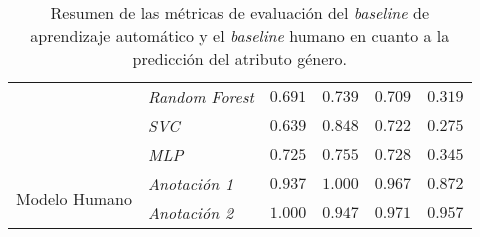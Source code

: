 \begin{table}[htpb]
{\begin{tabular}{llcccc}
        \cmidrule{2-6}
                                            & \emph{Random Forest}        & $0.691$ & $0.739$ & $0.709$ & $0.319$\\
        \cmidrule{2-6}
                                            & \emph{SVC}                  & $0.639$ & $0.848$ & $0.722$ & $0.275$\\
        \cmidrule{2-6}
                                            & \emph{MLP}                  & $0.725$ & $0.755$ & $0.728$ & $0.345$\\
        \midrule\midrule
        \multirow{2}{*}{Modelo Humano}      & \emph{Anotaci\'on 1}        & $0.937$ & $1.000$ & $0.967$ & $0.872$\\
        \cmidrule{2-6}
                                            & \emph{Anotaci\'on 2}        & $1.000$ & $0.947$ & $0.971$ & $0.957$\\
        \bottomrule
        \end{tabular}}
    \caption{Resumen de las m\'etricas de evaluaci\'on del \emph{baseline} de aprendizaje autom\'atico y el \emph{baseline} humano 
    en cuanto a la predicci\'on del atributo g\'enero.}
    \label{table:eval_baselines_gender}
\end{table}

